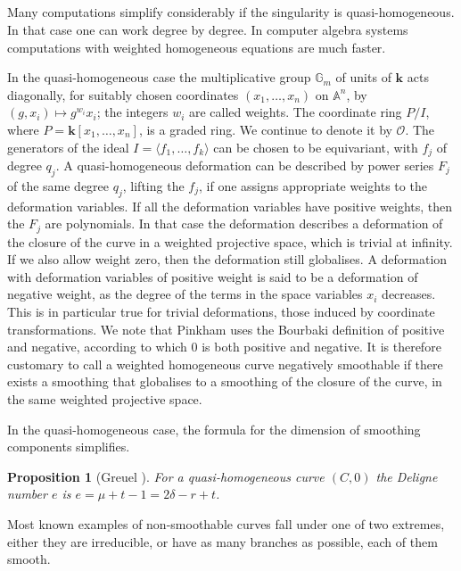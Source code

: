 \documentclass{amsart}
\newcommand{\A}{\mathbb{A}}
\newcommand{\G}{\mathbb{G}}
\renewcommand{\k}{\mathbf{k}} %
\newcommand{\mO}{\mathcal{O}}
\newtheorem{prop}[thm]{Proposition}
\theoremstyle{definition}
\theoremstyle{remark}
\begin{document}
\subsection{}
Many computations simplify considerably if the singularity is quasi-homoge\-neous. In that case
one can work degree by degree. In computer algebra systems computations with 
weighted homogeneous equations are much faster.

In the quasi-homogeneous case the
 multiplicative  group  $\G_m$ of units of $\k$ acts diagonally, for suitably chosen  
  coordinates $(x_1,\dots,x_n)$ on $\A^n$, 
 by $(g,x_i)\mapsto g^{w_i}x_i$; the integers $w_i$ are called weights.
The coordinate ring 
$P/I$, where $P=\k[x_1,\dots,x_n]$, is a graded ring.  We continue to denote it by $\mO$.
The generators of the ideal $I=\langle f_1,\dots,f_k\rangle$ can be chosen to be
equivariant, with $f_j$ of degree $q_j$. A quasi-homogeneous
deformation can be described by power series $F_j$  of the same degree $q_j$, lifting the $f_j$,
if one assigns appropriate weights to the deformation variables.
If all the deformation variables have positive weights, then the $F_j$ are polynomials.
In that case the deformation describes a deformation of the closure of the curve
in a weighted projective space, which is trivial at infinity.
If we also allow weight zero, then the deformation still globalises.
A deformation with deformation variables of positive weight is said to be a deformation
of negative weight, as the degree of the terms in the space variables $x_i$ decreases.
This is in particular true for trivial deformations, those induced by coordinate
transformations. 
We note that %
 Pinkham \cite{Pi,Pi2} uses 
the Bourbaki definition of positive and negative, according to which 0 is both positive and negative. 
It is therefore customary to call a weighted homogeneous curve negatively smoothable if
there exists a smoothing that globalises to a smoothing of the closure of the curve, in the same 
weighted projective space.

In the quasi-homogeneous case, the formula for the dimension of smoothing components simplifies. 
\begin{prop}[Greuel \cite{Gr}]
For a quasi-homogeneous curve $(C,0)$ the 
Deligne number  $e$ is $e=\mu + t-1=2\delta-r+t$.
\end{prop}

Most known examples of non-smoothable curves fall under one of two extremes, either
they are irreducible, or have as many branches as possible, each of them smooth.
\end{document}
